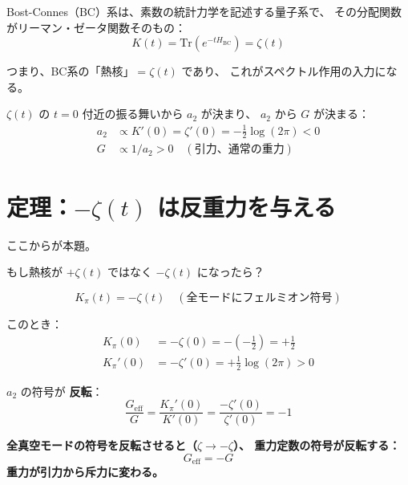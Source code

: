\documentclass[11pt,a4paper]{article}
\begin{document}
Bost-Connes（BC）系は、素数の統計力学を記述する量子系で、
その分配関数がリーマン・ゼータ関数そのもの：
\begin{equation}
  K(t) = \mathrm{Tr}(e^{-tH_{\mathrm{BC}}}) = \zeta(t)
\end{equation}

つまり、BC系の「熱核」$= \zeta(t)$ であり、
これがスペクトル作用の入力になる。

$\zeta(t)$ の $t = 0$ 付近の振る舞いから $a_2$ が決まり、
$a_2$ から $G$ が決まる：
\begin{align}
  a_2 &\propto K'(0) = \zeta'(0) = -\tfrac{1}{2}\log(2\pi) < 0 \\
  G &\propto 1/a_2 > 0 \quad (\text{引力、通常の重力})
\end{align}


\section{定理：$-\zeta(t)$ は反重力を与える}

ここからが本題。

もし熱核が $+\zeta(t)$ ではなく $-\zeta(t)$ になったら？

\begin{equation}
  K_{\pi}(t) = -\zeta(t) \quad (\text{全モードにフェルミオン符号})
\end{equation}

このとき：
\begin{align}
  K_{\pi}(0) &= -\zeta(0) = -(-\tfrac{1}{2}) = +\tfrac{1}{2} \\
  K_{\pi}'(0) &= -\zeta'(0) = +\tfrac{1}{2}\log(2\pi) > 0
\end{align}

$a_2$ の符号が \textbf{反転}：
\begin{equation}
  \frac{G_{\mathrm{eff}}}{G} = \frac{K_\pi'(0)}{K'(0)}
  = \frac{-\zeta'(0)}{\zeta'(0)} = -1
\end{equation}

\begin{tcolorbox}[colback=red!5,colframe=red!60!black,title=定理：トポロジカル反重力]
\textbf{全真空モードの符号を反転させると（$\zeta \to -\zeta$）、
重力定数の符号が反転する：}
\begin{equation}
  \boxed{G_{\mathrm{eff}} = -G}
\end{equation}
\textbf{重力が引力から斥力に変わる。}
\end{tcolorbox}
\end{document}

